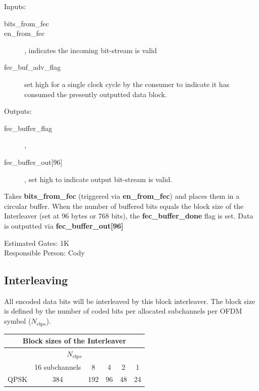 \documentclass[dvips,10pt,twocolumn]{article}
\begin{document}
	\begin{description}
		\item{Inputs:} \begin{description}
			\item[bits\_from\_fec]
			\item[en\_from\_fec], indicates the incoming
				bit-stream is valid
			\item[fec\_buf\_adv\_flag] set high for a
				single clock cycle by the consumer to
				indicate it has consumed the
				presently outputted data block.
		\end{description}
		\item{Outputs:} \begin{description}
			\item[fec\_buffer\_flag], 
			\item[fec\_buffer\_out{[96]}], set high to indicate
				output bit-stream is valid.
		\end{description}
	\end{description}

	Takes \textbf{bits\_from\_fec} (triggered via
	\textbf{en\_from\_fec}) and places them in a circular
	buffer. When the number of buffered bits equals the block
	size of the Interleaver (set at 96 bytes or 768 bits), the
	\textbf{fec\_buffer\_done} flag is set. Data is outputted
	via \textbf{fec\_buffer\_out[96]}

	Estimated Gates: 1K \\
	Responsible Person: Cody

	\subsection{Interleaving}
	\label{sec:interleaving}
	
	All encoded data bits will be interleaved by this block interleaver. The
	block size is defined by the number of coded bits per allocated subchannels 
	per OFDM symbol ($N_{cbps}$). 
 
	 \begin{center}
  	\begin{tabular}{|c|c|c|c|c|c|}
	\hline
	\multicolumn{6}{|c|}{Block sizes of the Interleaver} \\ \hline
	\multicolumn{6}{|c|}{$N_{cbps}$} \\ \hline
  	& 16 subchannels & 8 & 4 & 2 & 1 \\ \hline
	QPSK & 384 & 192 & 96 & 48 & 24 \\ \hline
	\end{tabular}
  	\end{center}
\end{document}

